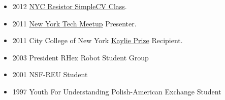 \documentclass[10pt]{article}
\newenvironment{outerlist}[1][\enskip\textbullet]%
        {\begin{itemize}[#1]}{\end{itemize}%
         \vspace{-.6\baselineskip}}
\begin{document}
\begin{outerlist}
\item 2012 \href{http://www.nycresistor.com/2012/02/29/tickets-still-available-for-this-amazing-new-class-this-sunday/}{NYC Resistor SimpleCV Class}.
\item 2011 \href{http://vimeo.com/28723189#t=4534}{New York Tech Meetup} Presenter.
\item 2011 City College of New York \href{http://entrepreneurship.ccny.cuny.edu/kaylieprize}{Kaylie Prize} Recipient.
\item 2003 President RHex Robot Student Group
\item 2001 NSF-REU Student
\item 1997 Youth For Understanding Polish-American Exchange Student
\end{outerlist}
\end{document}
